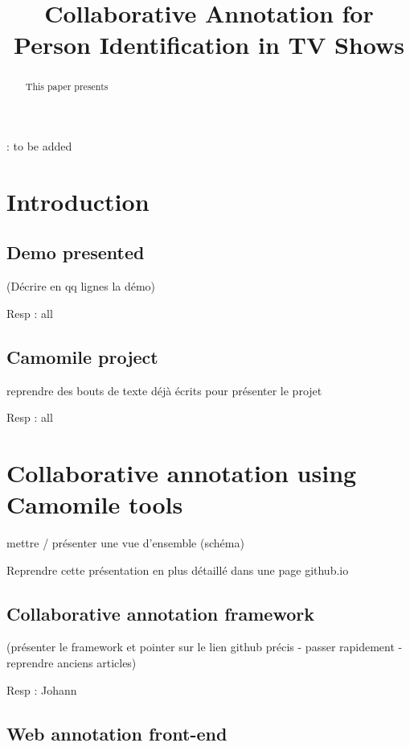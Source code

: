 \documentclass[a4paper]{article}
\title{Collaborative Annotation for Person Identification in TV Shows}
\begin{document}
  \maketitle
  \begin{abstract}
This paper presents 
  \end{abstract}
  : to be added

  \section{Introduction}
      \subsection{Demo presented}
(Décrire en qq lignes la démo) 

Resp : all

 \subsection{Camomile project}
reprendre des bouts de texte déjà écrits pour présenter le projet

Resp : all

      \section{Collaborative annotation using Camomile tools}

mettre / présenter une vue d'ensemble (schéma) 

Reprendre cette présentation en plus détaillé dans une page github.io 


      \subsection{Collaborative annotation framework}
(présenter le framework et pointer sur le lien github précis - passer rapidement - reprendre anciens articles)

Resp : Johann
  
      \subsection{Web annotation front-end}
\end{document}
